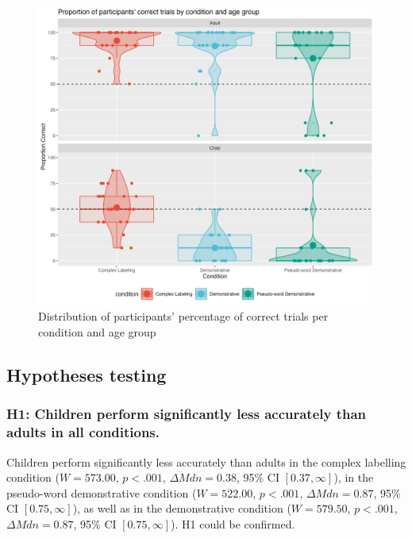 \documentclass[
  man,floatsintext]{apa6}
\begin{document}
\begin{figure}

{\centering \includegraphics[width=1\linewidth]{images/figure2_proportioncorrect} 

}

\caption{Distribution of participants' percentage of correct trials per condition and age group}\label{fig:plotting1}
\end{figure}

\subsection{Hypotheses testing}\label{hypotheses-testing}

\subsubsection{H1: Children perform significantly less accurately than adults in all conditions.}\label{h1-children-perform-significantly-less-accurately-than-adults-in-all-conditions.}

Children perform significantly less accurately than adults in the complex labelling
condition (\(W = 573.00\), \(p < .001\), \(\Delta \mathit{Mdn} = 0.38\), 95\% CI \([0.37, \infty]\)), in the pseudo-word demonstrative
condition (\(W = 522.00\), \(p < .001\), \(\Delta \mathit{Mdn} = 0.87\), 95\% CI \([0.75, \infty]\)), as well as in
the demonstrative condition (\(W = 579.50\), \(p < .001\), \(\Delta \mathit{Mdn} = 0.87\), 95\% CI \([0.75, \infty]\)). H1 could be confirmed.
\end{document}
